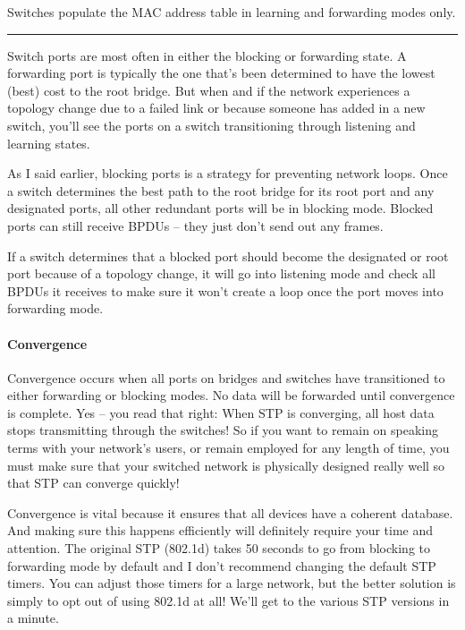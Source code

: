 \documentclass[b5paper,11pt]{memoir}
\begin{document}
Switches populate the MAC address table
in learning and forwarding modes only.

\begin{center}\rule{0.5\linewidth}{0.5pt}\end{center}

Switch ports are most often in either the blocking or forwarding state.
A forwarding port is typically the one that's been determined to have
the lowest (best) cost to the root bridge. But when and if the network
experiences a topology change due to a failed link or because someone
has added in a new switch, you'll see the ports on a switch
transitioning through listening and learning states.

As I said earlier, blocking ports is a strategy for preventing network
loops. Once a switch determines the best path to the root bridge for its
root port and any designated ports, all other redundant ports will be in
blocking mode. Blocked ports can still receive BPDUs -- they just don't
send out any frames.

If a switch determines that a blocked port should become the designated
or root port because of a topology change, it will go into listening
mode and check all BPDUs it receives to make sure it won't create a loop
once the port moves into forwarding mode.

\paragraph{Convergence}

Convergence occurs when all ports on bridges and switches have
transitioned to either forwarding or blocking modes. No data will be
forwarded until convergence is complete. Yes -- you read that right: When
STP is converging, all host data stops transmitting through the
switches! So if you want to remain on speaking terms with your network's
users, or remain employed for any length of time, you must make sure
that your switched network is physically designed really well so that
STP can converge quickly!

Convergence is vital because it ensures that all devices have a coherent
database. And making sure this happens efficiently will definitely
require your time and attention. The original STP (802.1d) takes 50
seconds to go from blocking to forwarding mode by default and I don't
recommend changing the default STP timers. You can adjust those timers
for a large network, but the better solution is simply to opt out of
using 802.1d at all! We'll get to the various STP versions in a minute.
\end{document}
